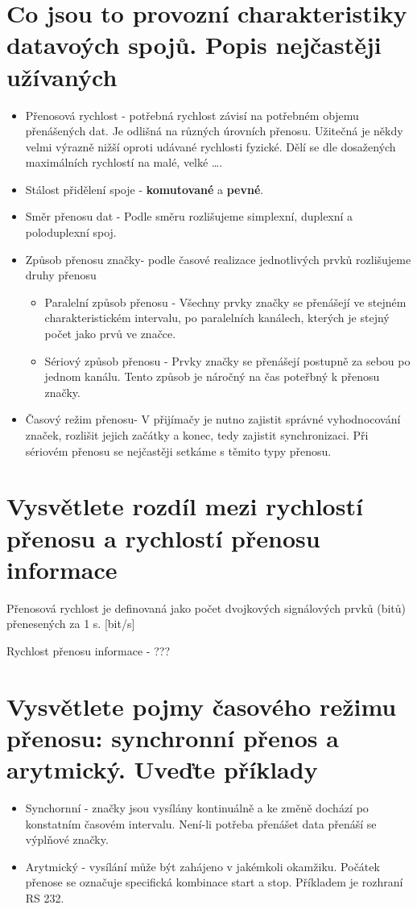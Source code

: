 \section{Co jsou to provozní charakteristiky datavoých spojů. Popis nejčastěji užívaných}
\begin{itemize}
    \item Přenosová rychlost - potřebná rychlost závisí na potřebném objemu přenášených dat.
    Je odlišná na různých úrovních přenosu.
    Užitečná je někdy velmi výrazně nižší oproti udávané rychlosti fyzické.
    Dělí se dle dosažených maximálních rychlostí na malé, velké \dots.
    \item Stálost přidělení spoje - \textbf{ komutované} a \textbf{pevné}.
    \item Směr přenosu dat - Podle směru rozlišujeme simplexní, duplexní a poloduplexní spoj.
    \item Způsob přenosu značky- podle časové realizace jednotlivých prvků rozlišujeme druhy přenosu
    \begin{itemize}
        \item Paralelní způsob přenosu - Všechny prvky značky se přenášejí ve stejném charakteristickém intervalu, po paralelních kanálech, kterých je stejný počet jako prvů ve značce.
        \item Sériový způsob přenosu - Prvky značky se přenášejí postupně za sebou po jednom kanálu.
        Tento způsob je náročný na čas poteřbný k přenosu značky.
                
    \end{itemize}
    \item Časový režim přenosu- V přijímačy je nutno zajistit správné vyhodnocování značek, rozlišit jejich začátky a konec, tedy zajistit synchronizaci.
    Při sériovém přenosu se nejčastěji setkáme s těmito typy přenosu.
\end{itemize}

\section{Vysvětlete rozdíl mezi rychlostí přenosu a rychlostí přenosu informace}
Přenosová rychlost je definovaná jako počet dvojkových signálových prvků (bitů) přenesených za 1 s. [bit/s]

Rychlost přenosu informace - ???

\section{Vysvětlete pojmy časového režimu přenosu: synchronní přenos a arytmický. Uveďte příklady}
\begin{itemize}
    \item Synchornní - značky jsou vysílány kontinuálně a ke změně dochází po konstatním časovém intervalu.
    Není-li potřeba přenášet data přenáší se výplňové značky.
    \item Arytmický - vysílání může být zahájeno v jakémkoli okamžiku. 
    Počátek přenose se označuje specifická kombinace start a stop. Příkladem je rozhraní RS 232.
    
\end{itemize}


